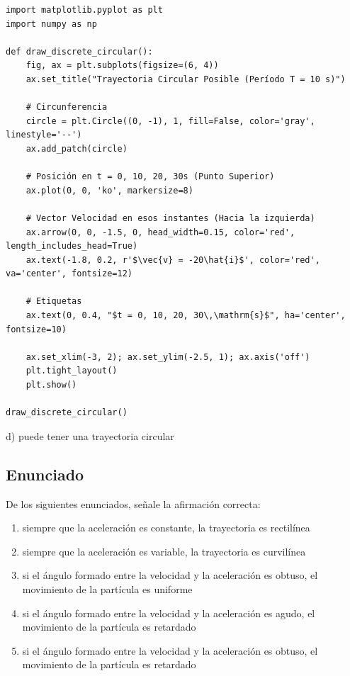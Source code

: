 \documentclass[12pt, a4paper]{article}
\begin{document}
\begin{lstlisting}
import matplotlib.pyplot as plt
import numpy as np

def draw_discrete_circular():
    fig, ax = plt.subplots(figsize=(6, 4))
    ax.set_title("Trayectoria Circular Posible (Período T = 10 s)")
    
    # Circunferencia
    circle = plt.Circle((0, -1), 1, fill=False, color='gray', linestyle='--')
    ax.add_patch(circle)
    
    # Posición en t = 0, 10, 20, 30s (Punto Superior)
    ax.plot(0, 0, 'ko', markersize=8) 
    
    # Vector Velocidad en esos instantes (Hacia la izquierda)
    ax.arrow(0, 0, -1.5, 0, head_width=0.15, color='red', length_includes_head=True)
    ax.text(-1.8, 0.2, r'$\vec{v} = -20\hat{i}$', color='red', va='center', fontsize=12)
    
    # Etiquetas
    ax.text(0, 0.4, "$t = 0, 10, 20, 30\,\mathrm{s}$", ha='center', fontsize=10)
    
    ax.set_xlim(-3, 2); ax.set_ylim(-2.5, 1); ax.axis('off')
    plt.tight_layout()
    plt.show()

draw_discrete_circular()
\end{lstlisting}

\begin{tcolorbox}[colback=green!5!white, colframe=green!50!black, title=Respuesta Final]
\centering \Large d) puede tener una trayectoria circular
\end{tcolorbox}

\newpage

\subsection*{Enunciado}
De los siguientes enunciados, señale la afirmación correcta:
\begin{enumerate}[label=\alph*)]
    \item siempre que la aceleración es constante, la trayectoria es rectilínea
    \item siempre que la aceleración es variable, la trayectoria es curvilínea
    \item si el ángulo formado entre la velocidad y la aceleración es obtuso, el movimiento de la partícula es uniforme
    \item si el ángulo formado entre la velocidad y la aceleración es agudo, el movimiento de la partícula es retardado
    \item si el ángulo formado entre la velocidad y la aceleración es obtuso, el movimiento de la partícula es retardado
\end{enumerate}
\end{document}
